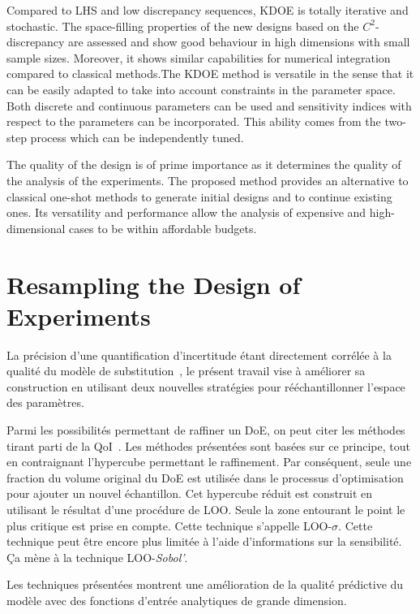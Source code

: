 Compared to LHS and low discrepancy sequences, KDOE is totally iterative and stochastic. The space-filling properties of the new designs based on the $C^2$-discrepancy are assessed and show good behaviour in high dimensions with small sample sizes. Moreover, it shows similar capabilities for numerical integration compared to classical methods.The KDOE method is versatile in the sense that it can be easily adapted to take into account constraints in the parameter space. Both discrete and continuous parameters can be used and sensitivity indices with respect to the parameters can be incorporated. This ability comes from the two-step process which can be independently tuned.

The quality of the design is of prime importance as it determines the quality of the analysis of the experiments. The proposed method provides an alternative to classical one-shot methods to generate initial designs and to continue existing ones. Its versatility and performance allow the analysis of expensive and high-dimensional cases to be within affordable budgets.



\chapter{Resampling the Design of Experiments}\label{chap:resample}

\begin{chapquote}
La précision d'une quantification d'incertitude étant directement corrélée à la qualité du modèle de substitution~\cite{iooss2010}, le présent travail vise à améliorer sa construction en utilisant deux nouvelles stratégies pour rééchantillonner l'espace des paramètres.

Parmi les possibilités permettant de raffiner un DoE, on peut citer les méthodes tirant parti de la QoI~\cite{Garud2017}. Les méthodes présentées sont basées sur ce principe, tout en contraignant l'hypercube permettant le raffinement. Par conséquent, seule une fraction du volume original du DoE est utilisée dans le processus d'optimisation pour ajouter un nouvel échantillon. Cet hypercube réduit est construit en utilisant le résultat d'une procédure de LOO. Seule la zone entourant le point le plus critique est prise en compte. Cette technique s'appelle LOO-$\sigma$. Cette technique peut être encore plus limitée à l'aide d'informations sur la sensibilité. Ça mène à la technique LOO-\textit{Sobol'}.

Les techniques présentées montrent une amélioration de la qualité prédictive du modèle avec des fonctions d'entrée analytiques de grande dimension.
\end{chapquote}

